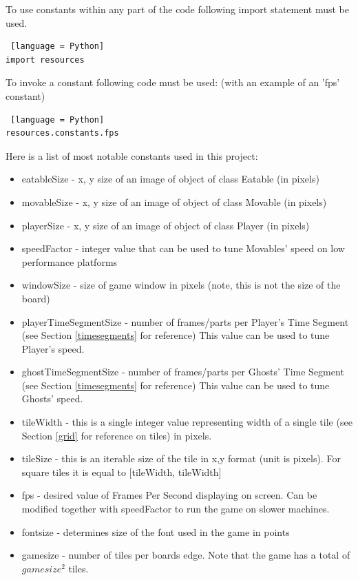 \documentclass[11pt,a4paper,notitlepage]{report}
\begin{document}
				To use constants within any part of the code following import statement must be used.
				\begin{lstlisting} [language = Python]
import resources
				\end{lstlisting}
				To invoke a constant following code must be used: (with an example of an 'fps' constant)
				\begin{lstlisting} [language = Python]
resources.constants.fps
				\end{lstlisting}
				Here is a list of most notable constants used in this project:
				\begin{itemize}
					\item
						eatableSize - x, y size of an image of object of class Eatable (in pixels)
					\item
						movableSize - x, y size of an image of object of class Movable (in pixels)
					\item
						playerSize - x, y size of an image of object of class Player (in pixels)
					\item
						speedFactor - integer value that can be used to tune Movables' speed on low performance platforms
					\item
						windowSize - size of game window in pixels (note, this is not the size of the board)
					\item
						playerTimeSegmentSize - number of frames/parts per Player's Time Segment (see Section \ref{timesegments} for reference) This value can be used to tune Player's speed.
					\item
						ghostTimeSegmentSize - number of frames/parts per Ghosts' Time Segment (see Section \ref{timesegments} for reference)  This value can be used to tune Ghosts' speed.
					\item
						tileWidth - this is a single integer value representing width of a single tile (see Section \ref{grid} for reference on tiles) in pixels.
					\item
						tileSize - this is an iterable size of the tile in x,y format (unit is pixels). For square tiles it is equal to [tileWidth, tileWidth]
					\item
						fps - desired value of Frames Per Second displaying on screen. Can be modified together with speedFactor to run the game on slower machines.
					\item
						fontsize - determines size of the font used in the game in points
					\item
						gamesize - number of tiles per boards edge. Note that the game has a total of $gamesize^2$ tiles.

\end{itemize}
\end{document}
